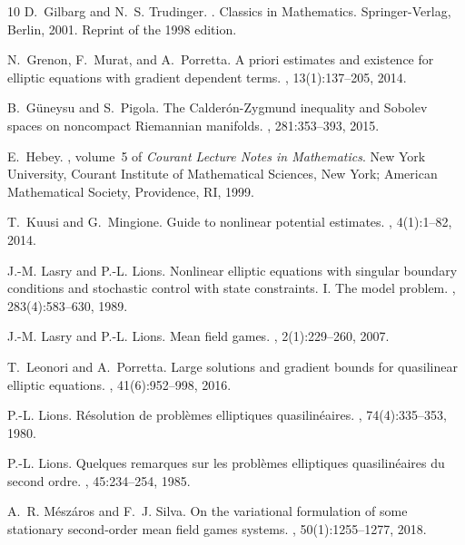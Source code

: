 \documentclass[10pt, a4paper, reqno, oneside]{amsart}
\theoremstyle{plain}
\theoremstyle{definition}
\theoremstyle{plain}
\theoremstyle{definition}
\theoremstyle{plain}
\renewcommand{\=}{:=}
\begin{document}
\begin{thebibliography}{10}
D.~Gilbarg and N.~S. Trudinger.
.
\newblock Classics in Mathematics. Springer-Verlag, Berlin, 2001.
\newblock Reprint of the 1998 edition.

N.~Grenon, F.~Murat, and A.~Porretta.
\newblock A priori estimates and existence for elliptic equations with gradient
  dependent terms.
, 13(1):137--205, 2014.

B.~G\"{u}neysu and S.~Pigola.
\newblock The {C}alder\'{o}n-{Z}ygmund inequality and {S}obolev spaces on
  noncompact {R}iemannian manifolds.
, 281:353--393, 2015.

E.~Hebey.
, volume~5 of {\em Courant Lecture Notes in Mathematics}.
\newblock New York University, Courant Institute of Mathematical Sciences, New
  York; American Mathematical Society, Providence, RI, 1999.

T.~Kuusi and G.~Mingione.
\newblock Guide to nonlinear potential estimates.
, 4(1):1--82, 2014.

J.-M. Lasry and P.-L. Lions.
\newblock Nonlinear elliptic equations with singular boundary conditions and
  stochastic control with state constraints. {I}. {T}he model problem.
, 283(4):583--630, 1989.

J.-M. Lasry and P.-L. Lions.
\newblock Mean field games.
, 2(1):229--260, 2007.

T.~Leonori and A.~Porretta.
\newblock Large solutions and gradient bounds for quasilinear elliptic
  equations.
, 41(6):952--998, 2016.

P.-L. Lions.
\newblock R\'{e}solution de probl\`emes elliptiques quasilin\'{e}aires.
, 74(4):335--353, 1980.

P.-L. Lions.
\newblock Quelques remarques sur les probl\`emes elliptiques quasilin\'{e}aires
  du second ordre.
, 45:234--254, 1985.

A.~R. M\'{e}sz\'{a}ros and F.~J. Silva.
\newblock On the variational formulation of some stationary second-order mean
  field games systems.
, 50(1):1255--1277, 2018.


\end{thebibliography}
\end{document}
